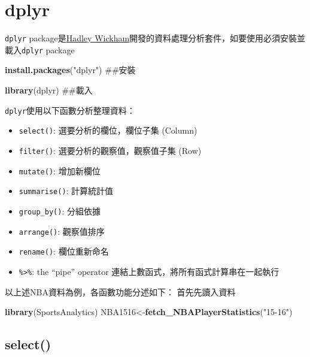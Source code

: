\documentclass[]{book}
\newenvironment{Shaded}{\begin{snugshade}}{\end{snugshade}}
\newcommand{\KeywordTok}[1]{\textcolor[rgb]{0.13,0.29,0.53}{\textbf{{#1}}}}
\newcommand{\StringTok}[1]{\textcolor[rgb]{0.31,0.60,0.02}{{#1}}}
\newcommand{\NormalTok}[1]{{#1}}
\providecommand{\tightlist}{%
  \setlength{\itemsep}{0pt}\setlength{\parskip}{0pt}}
\theoremstyle{definition}
\theoremstyle{definition}
\theoremstyle{remark}
\begin{document}
\section{dplyr}\label{dplyr}

\texttt{dplyr}\citep{R-dplyr} package是\href{http://hadley.nz/}{Hadley
Wickham}開發的資料處理分析套件，如要使用必須安裝並載入\texttt{dplyr}
package

\begin{Shaded}
\begin{Highlighting}[]
\KeywordTok{install.packages}\NormalTok{(}\StringTok{"dplyr"}\NormalTok{) ##安裝}
\end{Highlighting}
\end{Shaded}

\begin{Shaded}
\begin{Highlighting}[]
\KeywordTok{library}\NormalTok{(dplyr) ##載入}
\end{Highlighting}
\end{Shaded}

\texttt{dplyr}使用以下函數分析整理資料：

\begin{itemize}
\tightlist
\item
  \texttt{select()}: 選要分析的欄位，欄位子集 (Column)
\item
  \texttt{filter()}: 選要分析的觀察值，觀察值子集 (Row)
\item
  \texttt{mutate()}: 增加新欄位
\item
  \texttt{summarise()}: 計算統計值
\item
  \texttt{group\_by()}: 分組依據
\item
  \texttt{arrange()}: 觀察值排序
\item
  \texttt{rename()}: 欄位重新命名
\item
  \texttt{\%\textgreater{}\%}: the ``pipe'' operator
  連結上數函式，將所有函式計算串在一起執行
\end{itemize}

以上述NBA資料為例，各函數功能分述如下： 首先先讀入資料

\begin{Shaded}
\begin{Highlighting}[]
\KeywordTok{library}\NormalTok{(SportsAnalytics)}
\NormalTok{NBA1516<-}\KeywordTok{fetch_NBAPlayerStatistics}\NormalTok{(}\StringTok{"15-16"}\NormalTok{)}
\end{Highlighting}
\end{Shaded}

\subsection{select()}\label{select}
\end{document}

